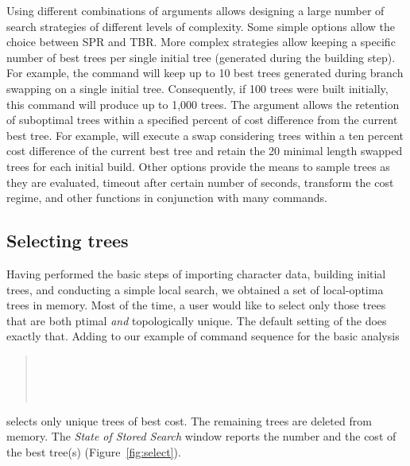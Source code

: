 {Using different combinations of  arguments allows designing a  large number of search strategies of different levels of complexity. Some simple options allow the choice between SPR and TBR. More complex strategies allow keeping a specific number of best trees per single initial tree (generated during the building step). For example, the command  will keep up to 10 best trees generated during branch swapping on a single initial tree. Consequently, if 100 trees were built initially, this command will produce up to 1,000 trees. The argument  allows the retention of suboptimal trees within a specified percent of cost difference from the current best tree. For example,  will execute a swap considering trees within a ten percent cost difference of the current best tree and retain the 20 minimal length swapped trees for each initial build. Other options provide the means to sample trees as they are evaluated, timeout after certain number of seconds, transform the cost regime, and other functions in conjunction with many \poy commands.

\subsection{Selecting trees}

Having performed the basic steps of importing character data, building initial trees, and conducting a simple local search, we obtained a set of local-optima trees in memory. Most of the time, a user would like to select only those trees that are both ptimal \emph{and} topologically unique. The default setting of the  does exactly that. Adding  to our example of command sequence for the basic analysis 
\begin{quote}
 	\\
 	\\
	\\
\end{quote}
selects only unique trees of best cost. The remaining trees are deleted from memory. The \emph{State of Stored Search} window reports the number and the cost of the best tree(s) (Figure~\ref{fig:select}).

}
